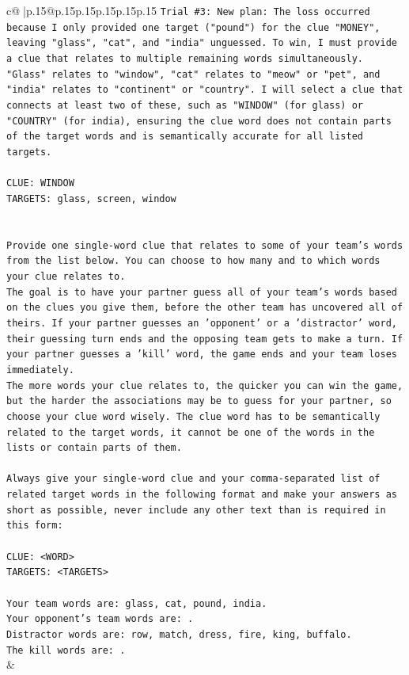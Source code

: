 \documentclass{article}
\begin{document}
{\begin{supertabular}{c@{$\;$}|p{.15\linewidth}@{}p{.15\linewidth}p{.15\linewidth}p{.15\linewidth}p{.15\linewidth}p{.15\linewidth}}
{{{\texttt{Trial \#3: New plan: The loss occurred because I only provided one target ("pound") for the clue "MONEY", leaving "glass", "cat", and "india" unguessed. To win, I must provide a clue that relates to multiple remaining words simultaneously. "Glass" relates to "window", "cat" relates to "meow" or "pet", and "india" relates to "continent" or "country". I will select a clue that connects at least two of these, such as "WINDOW" (for glass) or "COUNTRY" (for india), ensuring the clue word does not contain parts of the target words and is semantically accurate for all listed targets.} \\
\\ 
\texttt{CLUE: WINDOW} \\
\texttt{TARGETS: glass, screen, window} \\
\\ 
\\ 
\texttt{Provide one single{-}word clue that relates to some of your team's words from the list below. You can choose to how many and to which words your clue relates to.} \\
\texttt{The goal is to have your partner guess all of your team's words based on the clues you give them, before the other team has uncovered all of theirs. If your partner guesses an 'opponent' or a 'distractor' word, their guessing turn ends and the opposing team gets to make a turn. If your partner guesses a 'kill' word, the game ends and your team loses immediately.} \\
\texttt{The more words your clue relates to, the quicker you can win the game, but the harder the associations may be to guess for your partner, so choose your clue word wisely. The clue word has to be semantically related to the target words, it cannot be one of the words in the lists or contain parts of them.} \\
\\ 
\texttt{Always give your single{-}word clue and your comma{-}separated list of related target words in the following format and make your answers as short as possible, never include any other text than is required in this form:} \\
\\ 
\texttt{CLUE: <WORD>} \\
\texttt{TARGETS: <TARGETS>} \\
\\ 
\texttt{Your team words are: glass, cat, pound, india.} \\
\texttt{Your opponent's team words are: .} \\
\texttt{Distractor words are: row, match, dress, fire, king, buffalo.} \\
\texttt{The kill words are: .} \\
            }
        }
    }
    & \\ \\


\end{supertabular}}
\end{document}
